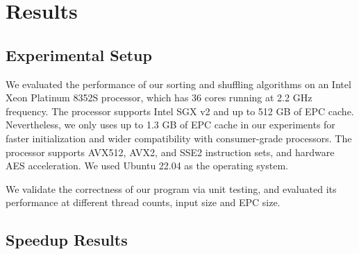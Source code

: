 \documentclass{article}
\begin{document}










\section{Results}
\subsection{Experimental Setup}
We evaluated the performance of our sorting and shuffling algorithms on an Intel Xeon Platinum 8352S processor, which has 36 cores running at 2.2 GHz
frequency. The processor supports Intel SGX v2 and up to 512 GB of EPC cache. Nevertheless, we only uses up to 1.3 GB of EPC cache in our experiments for faster initialization and wider compatibility with consumer-grade processors. The processor supports AVX512, AVX2, and SSE2 instruction sets, and hardware AES acceleration. We used Ubuntu 22.04 as the operating system.

We validate the correctness of our program via unit testing, and evaluated its performance at different thread counts, input size and EPC size.

\subsection{Speedup Results}

\printbibliography
\end{document}
